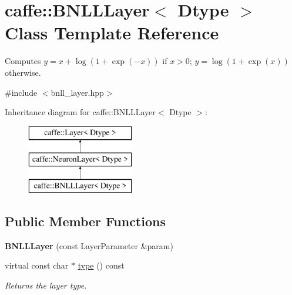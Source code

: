 \hypertarget{classcaffe_1_1BNLLLayer}{}\section{caffe\+:\+:B\+N\+L\+L\+Layer$<$ Dtype $>$ Class Template Reference}
\label{classcaffe_1_1BNLLLayer}


Computes $ y = x + \log(1 + \exp(-x)) $ if $ x > 0 $; $ y = \log(1 + \exp(x)) $ otherwise.  




{\ttfamily \#include $<$bnll\+\_\+layer.\+hpp$>$}

Inheritance diagram for caffe\+:\+:B\+N\+L\+L\+Layer$<$ Dtype $>$\+:\begin{figure}[H]
\begin{center}
\leavevmode
\includegraphics[height=3.000000cm]{classcaffe_1_1BNLLLayer}
\end{center}
\end{figure}
\subsection*{Public Member Functions}
\begin{DoxyCompactItemize}
\item 
{\bfseries B\+N\+L\+L\+Layer} (const Layer\+Parameter \&param)\hypertarget{classcaffe_1_1BNLLLayer_ab30d4b1d22f7489597449e09d74cf4b9}{}\label{classcaffe_1_1BNLLLayer_ab30d4b1d22f7489597449e09d74cf4b9}

\item 
virtual const char $\ast$ \hyperlink{classcaffe_1_1BNLLLayer_a1847167dcb7582eea70e9a5e0d99754a}{type} () const \hypertarget{classcaffe_1_1BNLLLayer_a1847167dcb7582eea70e9a5e0d99754a}{}\label{classcaffe_1_1BNLLLayer_a1847167dcb7582eea70e9a5e0d99754a}

\begin{DoxyCompactList}\small\item\em Returns the layer type. \end{DoxyCompactList}\end{DoxyCompactItemize}

